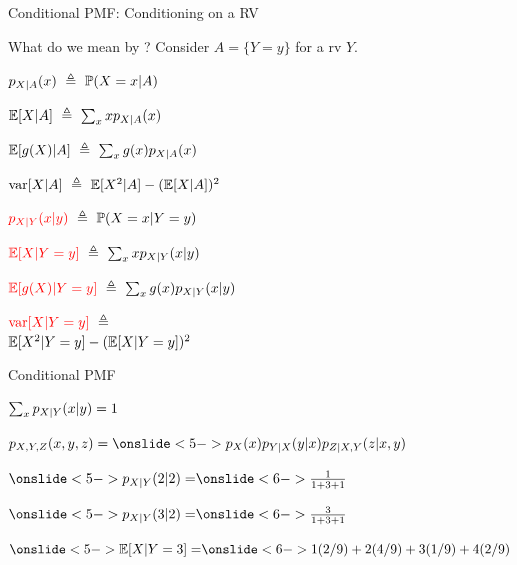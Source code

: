\begin{frame}{Conditional PMF: Conditioning on a RV }

What do we mean by ? Consider $A = \{Y = y\}$ for a rv $Y.$

\medskip

{
\plitemsep 0.2in
\bci 

\item<2-> $p_{X|A}(x) \ \triangleq \ \mathbb{P}( X=x | A )$ 

\item<3-> $\mathbb{E}[ X | A ] \ \triangleq \ \sum_x x p_{X|A}(x)$

\item<4-> $\mathbb{E}[ g(X) | A ] \ \triangleq \ \sum_x g(x) p_{X|A}(x)$

\item<5-> $\text{var}[ X | A ] \ \triangleq \ \mathbb{E}[ X^2 |A  ] - (\mathbb{E}[ X|A ])^2$
\eci 
}
{
\plitemsep 0.2in
\bci 

\item<2-> ${\color{red} p_{X|Y}(x|y)} \ \triangleq \ \mathbb{P}( X=x |{Y = y } )$ 

\item<3-> ${\color{red} \mathbb{E}[ X | Y=y ]} \ \triangleq \ \sum_x x p_{X|Y}(x|y)$

\item<4-> $\redf{\expect{g(X) | Y=y}} \ \eqdef \ \sum_x g(x) \pxcy$

\item<5-> $\redf{\var{X | Y=y}} \ \eqdef$ \\ $\mathbb{E}[ X^2 |Y=y  ] - (\mathbb{E}[ X|Y=y ])^2$
\eci 

}

\end{frame}

\begin{frame}{Conditional PMF}


{
\plitemsep 0.1in
\small

\bci 
\item {} 

\item<3-> $\sum_{x} p_{X|Y}(x|y) = 1$

\item {}


\item $p_{X,Y,Z}(x,y,z) = \onslide<5->{\px \pycx p_{Z|X,Y}(z | x,y)}$
\eci 
}
{


\small

$ \onslide<5->{p_{X|Y}(2|2) =} \onslide<6->{\frac{1}{1+3+1}}$

\bigskip
$ \onslide<5->{p_{X|Y}(3|2)=} \onslide<6->{\frac{3}{1+3+1}}$

\bigskip

$ \onslide<5->{\expect{X | Y = 3} =} \onslide<6->{1(2/9)+ 2(4/9)+3(1/9)+4(2/9)} $

}
\end{frame}

